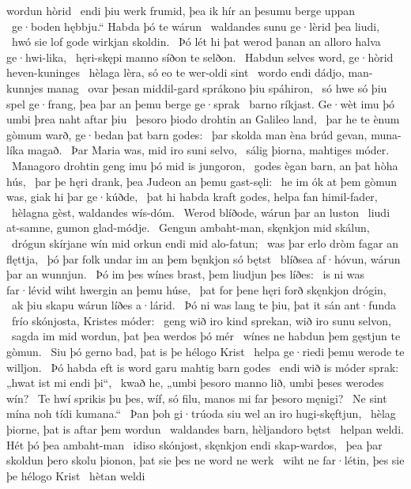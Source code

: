 wordun hòrid \hld\ endi þiu werk frumid,
þea ik hír an þesumu berge uppan \hld\ ge·boden hębbju.“
Habda þó te wárun \hld\ waldandes sunu
ge·lèrid þea liudi, \hld\ hwó sie lof gode
wirkjan skoldin. \hld\ Þó lét hi þat werod þanan
an alloro halva ge·hwi-lika, \hld\ hęri-skępi manno
síðon te selðon. \hld\ Habdun selves word,
ge·hòrid heven-kuninges \hld\ hèlaga lèra,
só eo te wer-oldi sint \hld\ wordo endi dádjo,
man-kunnjes manag \hld\ ovar þesan middil-gard
sprákono þiu spáhiron, \hld\ só hwe só þiu spel ge·frang,
þea þar an þemu berge ge·sprak \hld\ barno ríkjast.
Ge·wèt imu þó umbi þrea naht aftar þiu \hld\ þesoro þiodo drohtin
an Galileo land, \hld\ þar he te ènum gòmum warð,
ge·bedan þat barn godes: \hld\ þar skolda man èna brúd gevan,
muna-líka magað. \hld\ Þar Maria was,
mid iro suni selvo, \hld\ sálig þiorna,
mahtiges móder. \hld\ Managoro drohtin
geng imu þó mid is jungoron, \hld\ godes ègan barn,
an þat hòha hús, \hld\ þar þe hęri drank,
þea Judeon an þemu gast-sęli: \hld\ he im ók at þem gòmun was,
giak hi þar ge·kúðde, \hld\ þat hi habda kraft godes,
helpa fan himil-fader, \hld\ hèlagna gèst,
waldandes wís-dóm. \hld\ Werod blíðode,
wárun þar an luston \hld\ liudi at-samne,
gumon glad-módje. \hld\ Gengun ambaht-man,
skęnkjon mid skálun, \hld\ drógun skírjane wín
mid orkun endi mid alo-fatun; \hld\ was þar erlo dròm
fagar an flęttja, \hld\ þó þar folk undar im
an þem bęnkjon só bętst \hld\ blíðsea af·hóvun,
wárun þar an wunnjun. \hld\ Þó im þes wínes brast,
þem liudjun þes líðes: \hld\ is ni was far·lévid wiht
hwergin an þemu húse, \hld\ þat for þene hęri forð
skęnkjon drógin, \hld\ ak þiu skapu wárun
líðes a·lárid. \hld\ Þó ni was lang te þiu,
þat it sán ant·funda \hld\ frío skónjosta,
Kristes móder: \hld\ geng wið iro kind sprekan,
wið iro sunu selvon, \hld\ sagda im mid wordun,
þat þea werdos þó mér \hld\ wínes ne habdun
þem gęstjun te gòmun. \hld\ Siu þó gerno bad,
þat is þe hélogo Krist \hld\ helpa ge·riedi
þemu werode te willjon. \hld\ Þó habda eft is word garu
mahtig barn godes \hld\ endi wið is móder sprak:
„hwat ist mi endi þi“, \hld\ kwað he, „umbi þesoro manno lið,
umbi þeses werodes wín? \hld\ Te hwí sprikis þu þes, wíf, só filu,
manos mi far þesoro męnigi? \hld\ Ne sint mína noh
tídi kumana.“ \hld\ Þan þoh gi·trúoda siu wel
an iro hugi-skęftjun, \hld\ hèlag þiorne,
þat is aftar þem wordun \hld\ waldandes barn,
hèljandoro bętst \hld\ helpan weldi.
Hét þó þea ambaht-man \hld\ idiso skónjost,
skęnkjon endi skap-wardos, \hld\ þea þar skoldun þero skolu þionon,
þat sie þes ne word ne werk \hld\ wiht ne far·létin,
þes sie þe hélogo Krist \hld\ hètan weldi
